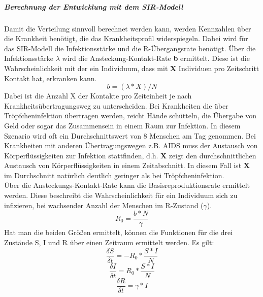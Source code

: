 \subparagraph{Berechnung der Entwicklung mit dem SIR-Modell}
Damit die Verteilung sinnvoll berechnet werden kann, werden Kennzahlen über die Krankheit benötigt, die das Krankheitsprofil widerspiegeln. Dabei wird für das SIR-Modell die Infektionsstärke und die \grqq R\glqq{}-Übergangsrate benötigt.
Über die Infektionsstärke $\lambda$ wird die Ansteckung-Kontakt-Rate \textbf{b} ermittelt. Diese ist die Wahrscheinlichkeit mit der ein Individuum, dass mit \textbf{X} Individuen pro Zeitschritt Kontakt hat, erkranken kann.
\begin{equation}
b = ( \lambda * X ) / N
\end{equation}
Dabei ist die Anzahl X der Kontakte pro Zeiteinheit je nach Krankheitsübertragungsweg zu unterscheiden. Bei Krankheiten die über Tröpfcheninfektion übertragen werden, reicht Hände schütteln, die Übergabe von Geld oder sogar das Zusammensein in einem Raum zur Infektion. In diesem Szenario wird oft ein Durchschnittswert von 8 Menschen am Tag genommen.%
Bei Krankheiten mit anderen Übertragungswegen z.B. AIDS muss der Austausch von Körperflüssigkeiten zur Infektion stattfinden, d.h. \textbf{X} zeigt den durchschnittlichen Austausch von Körperflüssigkeiten in einem Zeitabschnitt. In diesem Fall ist \textbf{X} im Durchschnitt natürlich deutlich geringer als bei Tröpfcheninfektion.\\
Über die Ansteckungs-Kontakt-Rate kann die Basisreproduktionsrate ermittelt werden. Diese beschreibt die Wahrscheinlichkeit für ein Individuum sich zu infizieren, bei wachsender Anzahl der Menschen im \glqq R\grqq-Zustand ($\gamma$).
\begin{equation}
R_0 = \frac{ b * N }{ \gamma }
\end{equation}
Hat man die beiden Größen ermittelt, können die Funktionen für die drei Zustände S, I und R über einen Zeitraum ermittelt werden. 
Es gilt:
\begin{equation}
\frac{ \delta S }{ \delta t } = -R_0 * \frac{S * I}{N}
\end{equation}
\begin{equation}
\frac{\delta I }{\delta t} = R_0 * \frac{S * I}{N}
\end{equation}
\begin{equation}
\frac{\delta R }{\delta t} = \gamma * I
\end{equation}

